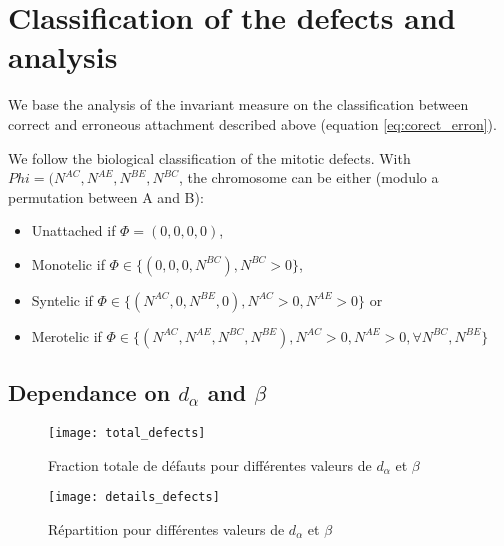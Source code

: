 \documentclass[a4paper,12pt]{article}
\begin{document}
\section{Classification of the defects and analysis}

We base the analysis of the invariant measure on the classification
between correct and erroneous attachment described above (equation
\ref{eq:corect_erron}).

We follow the biological classification of the mitotic defects. With
$Phi = (N^{AC}, N^{AE}, N^{BE}, N^{BC}$, the chromosome can be either
(modulo a permutation between A and B):
\begin{itemize}
\item Unattached if $\Phi = (0,0,0,0)$,
\item Monotelic if $\Phi \in \{(0,0,0, N^{BC}),N^{BC}> 0\}$,
\item Syntelic if $\Phi \in \{(N^{AC},0,N^{BE},0),N^{AC}> 0, N^{AE}> 0\}$ or
\item Merotelic if $\Phi \in \{(N^{AC},N^{AE},N^{BC},N^{BE}), N^{AC}>
    0, N^{AE}> 0, \forall N^{BC}, N^{BE}\}  $
\end{itemize}

\subsection{Dependance on $d_{\alpha}$ and $\beta$}

\begin{figure}[htbp]
  \centering
  \texttt{[image: total\_defects]}
  \caption{Fraction totale de défauts pour différentes valeurs de $d_{\alpha}$ et $\beta$}
  \label{fig:total}
\end{figure}

\begin{figure}[htbp]
  \centering
  \texttt{[image: details\_defects]}
  \caption{Répartition pour différentes valeurs de $d_{\alpha}$ et $\beta$}
  \label{fig:total}
\end{figure}
\end{document}
